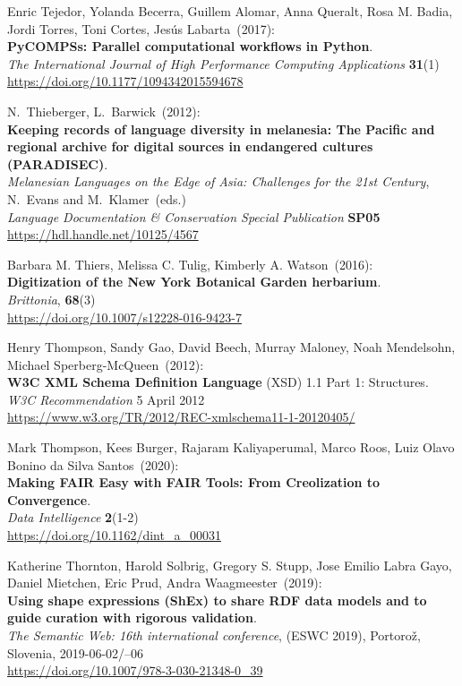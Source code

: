 \begin{thebibliography}{9}
Enric Tejedor, Yolanda Becerra, Guillem Alomar, Anna Queralt, Rosa M. Badia, Jordi Torres, Toni Cortes, Jesús Labarta~(2017): \\
\textbf{PyCOMPSs: Parallel computational workflows in Python}.\\
\emph{The International Journal of High Performance Computing Applications}
\textbf{31}(1) \\
\url{https://doi.org/10.1177/1094342015594678}

N.~Thieberger, L.~Barwick~(2012): \\
\textbf{Keeping records of language diversity in melanesia: The Pacific and regional archive for digital sources in endangered cultures (PARADISEC)}.\\
\emph{Melanesian Languages on the Edge of Asia: Challenges for the 21st Century}, N.~Evans and M.~Klamer~(eds.)\\
\emph{Language Documentation \& Conservation Special Publication}
\textbf{SP05} \\
\url{https://hdl.handle.net/10125/4567}

Barbara M. Thiers, Melissa C. Tulig, Kimberly A. Watson~(2016): \\
\textbf{Digitization of the New York Botanical Garden herbarium}.\\
\emph{Brittonia}, \textbf{68}(3)\\
\url{https://doi.org/10.1007/s12228-016-9423-7}

Henry Thompson, Sandy Gao, David Beech, Murray Maloney, Noah Mendelsohn, Michael Sperberg-McQueen~(2012): \\
\textbf{W3C XML Schema Definition Language} ({XSD}) 1.1 {Part} 1: {Structures}. \\
\emph{W3C Recommendation} 5 April 2012 \\
\url{https://www.w3.org/TR/2012/REC-xmlschema11-1-20120405/}

Mark Thompson, Kees Burger, Rajaram Kaliyaperumal, Marco Roos, Luiz Olavo Bonino da Silva Santos~(2020): \\
\textbf{Making FAIR Easy with FAIR Tools: From Creolization to Convergence}.\\
\emph{Data Intelligence} \textbf{2}(1-2)\\
\url{https://doi.org/10.1162/dint_a_00031}

Katherine Thornton, Harold Solbrig, Gregory S. Stupp, Jose Emilio Labra Gayo, Daniel Mietchen, Eric Prud, Andra Waagmeester~(2019): \\
\textbf{Using shape expressions ({ShEx}) to share {RDF} data models and
to guide curation with rigorous validation}. \\
\emph{The Semantic Web: 16th international conference}, (ESWC 2019), Portorož, Slovenia,
2019-06-02/--06\\
\url{https://doi.org/10.1007/978-3-030-21348-0_39}


\end{thebibliography}

